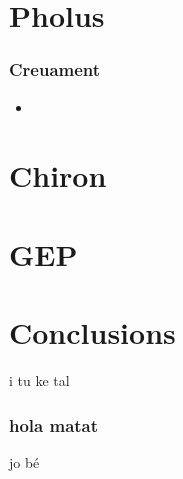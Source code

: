 \documentclass{beamer}
\begin{document}
\section{Pholus} %
\label{sec:Pholus}

\begin{frame}
	\frametitle{Creuament }
	\begin{itemize}
		\item 
	\end{itemize}
\end{frame}

\section{Chiron} %
\label{sec:Chiron}

\section{GEP} %
\label{sec:GEP}

\section{Conclusions} %
\label{sec:Conclusions}
\begin{frame}
	i tu ke tal
\end{frame}

\subsubsection{hola matat} %
\label{ssub:hola matat}
\begin{frame}
	jo bé
\end{frame}




\end{document}
